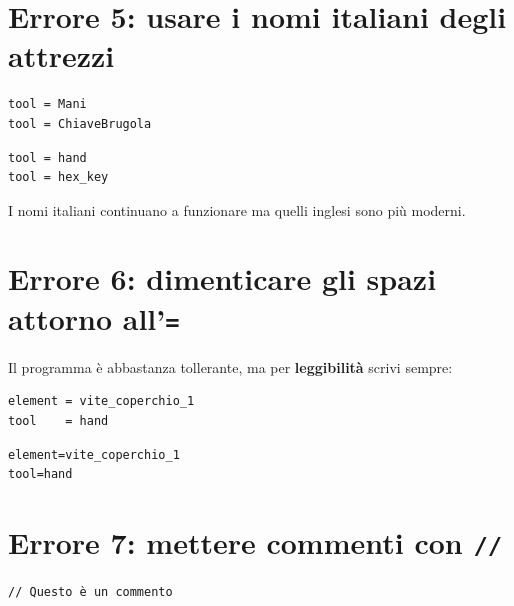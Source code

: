 ﻿\documentclass[a4paper,12pt,oneside]{book}
\begin{document}
\section{Errore 5: usare i nomi italiani degli attrezzi}

\begin{sbagliato}
\begin{lstlisting}
tool = Mani
tool = ChiaveBrugola
\end{lstlisting}
\end{sbagliato}

\begin{giusto}[Stile v3]
\begin{lstlisting}
tool = hand
tool = hex_key
\end{lstlisting}
\end{giusto}

I nomi italiani continuano a funzionare ma quelli inglesi sono più moderni.

\section{Errore 6: dimenticare gli spazi attorno all'\texttt{=}}

Il programma è abbastanza tollerante, ma per \textbf{leggibilità} scrivi sempre:

\begin{giusto}[Ottimo]
\begin{lstlisting}
element = vite_coperchio_1
tool    = hand
\end{lstlisting}
\end{giusto}

\begin{sbagliato}
\begin{lstlisting}
element=vite_coperchio_1
tool=hand
\end{lstlisting}
\end{sbagliato}

\section{Errore 7: mettere commenti con \texttt{//}}

\begin{sbagliato}
\begin{lstlisting}
// Questo è un commento
\end{lstlisting}
\end{sbagliato}
\end{document}
